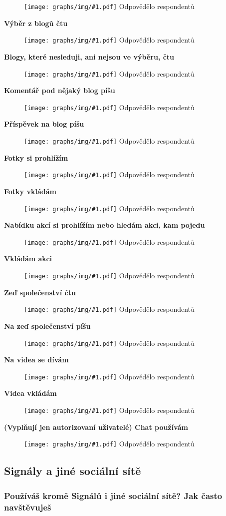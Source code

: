 \documentclass[12pt, a4paper, twoside]{article}
\newcommand{\answercount}[1]{Odpovědělo  respondentů}
\newcommand{\includegraph}[2]{
  \begin{figure}[H]
    \centering
    \textbf{#2}
    \texttt{[image: graphs/img/\#1.pdf]}
    \answercount{#1}
  \end{figure}
}
\begin{document}
\includegraph{funkcionality_sledovane_blogy_ctu}{}

\textbf{Výběr z blogů čtu}

\includegraph{funkcionality_blogy_vyber_ctu}{}

\textbf{Blogy, které nesleduji, ani nejsou ve výběru, čtu}

\includegraph{funkcionality_blogy_nesledovane_ctu}{}

\textbf{Komentář pod nějaký blog píšu}

\includegraph{funkcionality_blog_komentuji}{}

\textbf{Příspěvek na blog píšu}

\includegraph{funkcionality_blog_pisu}{}

\textbf{Fotky si prohlížím}

\includegraph{funkcionality_fotky_prohlizim}{}

\textbf{Fotky vkládám}

\includegraph{funkcionality_fotky_vkladam}{}

\textbf{Nabídku akcí si prohlížím nebo hledám akci, kam pojedu}

\includegraph{funkcionality_akce_prohlizim}{}

\textbf{Vkládám akci}

\includegraph{funkcionality_akce_vkladam}{}

\textbf{Zeď společenství čtu}

\includegraph{funkcionality_zed_spolecenstvi_ctu}{}

\textbf{Na zeď společenství píšu}

\includegraph{funkcionality_zed_spolecenstvi_pisu}{}

\textbf{Na videa se dívám}

\includegraph{funkcionality_videa_prohlizim}{}

\textbf{Videa vkládám}

\includegraph{funkcionality_videa_vkladam}{}

\textbf{(Vyplňují jen autorizovaní uživatelé) Chat používám}

\includegraph{funkcionality_autorizovani_chat}{}

\subsection{Signály a jiné sociální sítě}\label{sec:jinesite}

\subsubsection{Používáš kromě Signálů i jiné sociální sítě? Jak často navštěvuješ}
\end{document}
